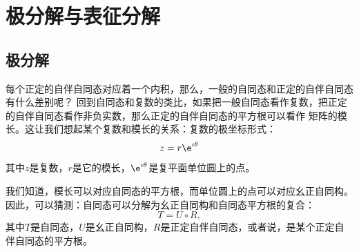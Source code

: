 \documentclass[12pt,UTF8]{ctexbook}
\begin{document}

\section{极分解与表征分解}

\subsection{极分解}
每个正定的自伴自同态对应着一个内积，那么，一般的自同态和正定的自伴自同态有什么差别呢？
回到自同态和复数的类比，如果把一般自同态看作复数，把正定的自伴自同态看作非负实数，那么正定的自伴自同态的平方根可以看作
矩阵的模长。这让我们想起某个复数和模长的关系：复数的极坐标形式：
$$ z = r \e^{\imath \theta} $$
其中$z$是复数，$r$是它的模长，$\e^{\imath \theta}$是复平面单位圆上的点。

我们知道，模长可以对应自同态的平方根，而单位圆上的点可以对应幺正自同构。
因此，可以猜测：自同态可以分解为幺正自同构和自同态平方根的复合：
$$ T = U \circ R,$$
其中$T$是自同态，$U$是幺正自同构，$R$是正定自伴自同态，或者说，是某个正定自伴自同态的平方根。
\end{document}
